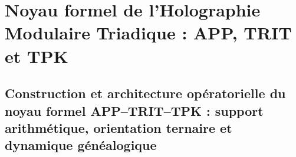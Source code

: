 %




\part{Noyau formel de l'Holographie Modulaire Triadique : APP, TRIT et TPK}

\chapter{Construction et architecture opératorielle du noyau formel APP–TRIT–TPK : support arithmétique, orientation ternaire et dynamique généalogique}
\label{chap:sucesor-102-01}







